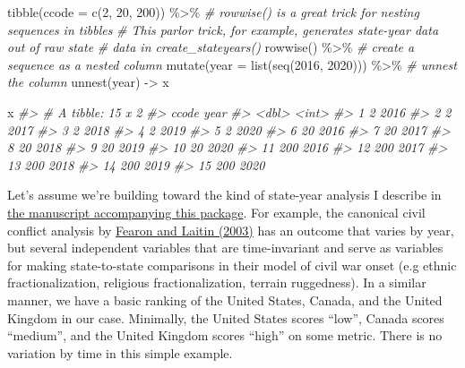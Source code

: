 \documentclass[
  11pt,
]{article}
\newenvironment{Shaded}{\begin{snugshade}}{\end{snugshade}}
\newcommand{\AttributeTok}[1]{\textcolor[rgb]{0.77,0.63,0.00}{#1}}
\newcommand{\CommentTok}[1]{\textcolor[rgb]{0.56,0.35,0.01}{\textit{#1}}}
\newcommand{\DecValTok}[1]{\textcolor[rgb]{0.00,0.00,0.81}{#1}}
\newcommand{\FunctionTok}[1]{\textcolor[rgb]{0.00,0.00,0.00}{#1}}
\newcommand{\NormalTok}[1]{#1}
\newcommand{\OtherTok}[1]{\textcolor[rgb]{0.56,0.35,0.01}{#1}}
\newcommand{\SpecialCharTok}[1]{\textcolor[rgb]{0.00,0.00,0.00}{#1}}
\begin{document}
\begin{Shaded}
\begin{Highlighting}[]
\FunctionTok{tibble}\NormalTok{(}\AttributeTok{ccode =} \FunctionTok{c}\NormalTok{(}\DecValTok{2}\NormalTok{, }\DecValTok{20}\NormalTok{, }\DecValTok{200}\NormalTok{)) }\SpecialCharTok{\%\textgreater{}\%}
  \CommentTok{\# rowwise() is a great trick for nesting sequences in tibbles}
  \CommentTok{\# This parlor trick, for example, generates state{-}year data out of raw state }
  \CommentTok{\# data in create\_stateyears()}
  \FunctionTok{rowwise}\NormalTok{() }\SpecialCharTok{\%\textgreater{}\%}
  \CommentTok{\# create a sequence as a nested column}
  \FunctionTok{mutate}\NormalTok{(}\AttributeTok{year =} \FunctionTok{list}\NormalTok{(}\FunctionTok{seq}\NormalTok{(}\DecValTok{2016}\NormalTok{, }\DecValTok{2020}\NormalTok{))) }\SpecialCharTok{\%\textgreater{}\%}
  \CommentTok{\# unnest the column}
  \FunctionTok{unnest}\NormalTok{(year) }\OtherTok{{-}\textgreater{}}\NormalTok{ x}

\NormalTok{x}
\CommentTok{\#\textgreater{} \# A tibble: 15 x 2}
\CommentTok{\#\textgreater{}    ccode  year}
\CommentTok{\#\textgreater{}    \textless{}dbl\textgreater{} \textless{}int\textgreater{}}
\CommentTok{\#\textgreater{}  1     2  2016}
\CommentTok{\#\textgreater{}  2     2  2017}
\CommentTok{\#\textgreater{}  3     2  2018}
\CommentTok{\#\textgreater{}  4     2  2019}
\CommentTok{\#\textgreater{}  5     2  2020}
\CommentTok{\#\textgreater{}  6    20  2016}
\CommentTok{\#\textgreater{}  7    20  2017}
\CommentTok{\#\textgreater{}  8    20  2018}
\CommentTok{\#\textgreater{}  9    20  2019}
\CommentTok{\#\textgreater{} 10    20  2020}
\CommentTok{\#\textgreater{} 11   200  2016}
\CommentTok{\#\textgreater{} 12   200  2017}
\CommentTok{\#\textgreater{} 13   200  2018}
\CommentTok{\#\textgreater{} 14   200  2019}
\CommentTok{\#\textgreater{} 15   200  2020}
\end{Highlighting}
\end{Shaded}

Let's assume we're building toward the kind of state-year analysis I describe in \href{http://svmiller.com/peacesciencer/ms.pdf}{the manuscript accompanying this package}. For example, the canonical civil conflict analysis by \href{https://www.cambridge.org/core/journals/american-political-science-review/article/abs/ethnicity-insurgency-and-civil-war/B1D5D0E7C782483C5D7E102A61AD6605}{Fearon and Laitin (2003)} has an outcome that varies by year, but several independent variables that are time-invariant and serve as variables for making state-to-state comparisons in their model of civil war onset (e.g ethnic fractionalization, religious fractionalization, terrain ruggedness). In a similar manner, we have a basic ranking of the United States, Canada, and the United Kingdom in our case. Minimally, the United States scores ``low'', Canada scores ``medium'', and the United Kingdom scores ``high'' on some metric. There is no variation by time in this simple example.
\end{document}
